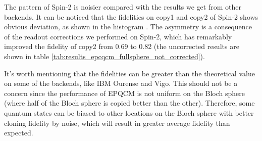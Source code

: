 The pattern of Spin-2 is noisier compared with the results we get from other backends. It can be noticed that the fidelities on copy1 and copy2 of Spin-2 shows obvious deviation, as shown in the histogram \label{fig:epc_histo_sphere_corrected}. The asymmetry is a consequence of the readout corrections we performed on Spin-2, which has remarkably improved the fidelity of copy2 from 0.69 to 0.82 (the uncorrected results are shown in table \ref{tab:results_epcqcm_fullsphere_not_corrected}).

It's worth mentioning that the fidelities can be greater than the theoretical value on some of the backends, like IBM Ourense and Vigo. This should not be a concern since the performance of EPQCM is not uniform on the Bloch sphere (where half of the Bloch sphere is copied better than the other). Therefore, some quantum states can be biased to other locations on the Bloch sphere with better cloning fidelity by noise, which will result in greater average fidelity than expected.

